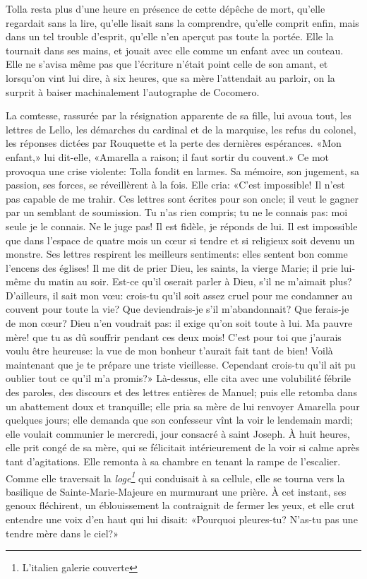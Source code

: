 Tolla resta plus d'une heure en présence de cette dépêche de mort, qu'elle regardait sans la lire, qu'elle lisait sans la comprendre, qu'elle comprit enfin, mais dans un tel trouble d'esprit, qu'elle n'en aperçut pas toute la portée. Elle la tournait dans ses mains, et jouait avec elle comme un enfant avec un couteau. Elle ne s'avisa même pas que l'écriture n'était point celle de son amant, et lorsqu'on vint lui dire, à six heures, que sa mère l'attendait au parloir, on la surprit à baiser machinalement l'autographe de Cocomero.

La comtesse, rassurée par la résignation apparente de sa fille, lui avoua tout, les lettres de Lello, les démarches du cardinal et de la marquise, les refus du colonel, les réponses dictées par Rouquette et la perte des dernières espérances. «Mon enfant,» lui dit-elle, «Amarella a raison; il faut sortir du couvent.» Ce mot provoqua une crise violente: Tolla fondit en larmes. Sa mémoire, son jugement, sa passion, ses forces, se réveillèrent à la fois. Elle cria: «C'est impossible! Il n'est pas capable de me trahir. Ces lettres sont écrites pour son oncle; il veut le gagner par un semblant de soumission. Tu n'as rien compris; tu ne le connais pas: moi seule je le connais. Ne le juge pas! Il est fidèle, je réponds de lui. Il est impossible que dans l'espace de quatre mois un c\oe{}ur si tendre et si religieux soit devenu un monstre. Ses lettres respirent les meilleurs sentiments: elles sentent bon comme l'encens des églises! Il me dit de prier Dieu, les saints, la vierge Marie; il prie lui-même du matin au soir. Est-ce qu'il oserait parler à Dieu, s'il ne m'aimait plus? D'ailleurs, il sait mon v\oe{}u: crois-tu qu'il soit assez cruel pour me condamner au couvent pour toute la vie? Que deviendrais-je s'il m'abandonnait? Que ferais-je de mon c\oe{}ur? Dieu n'en voudrait pas: il exige qu'on soit toute à lui. Ma pauvre mère! que tu as dû souffrir pendant ces deux mois! C'est pour toi que j'aurais voulu être heureuse: la vue de mon bonheur t'aurait fait tant de bien! Voilà maintenant que je te prépare une triste vieillesse. Cependant crois-tu qu'il ait pu oublier tout ce qu'il m'a promis?» Là-dessus, elle cita avec une volubilité fébrile des paroles, des discours et des lettres entières de Manuel; puis elle retomba dans un abattement doux et tranquille; elle pria sa mère de lui renvoyer Amarella pour quelques jours; elle demanda que son confesseur vînt la voir le lendemain mardi; elle voulait communier le mercredi, jour consacré à saint Joseph. À huit heures, elle prit congé de sa mère, qui se félicitait intérieurement de la voir si calme après tant d'agitations. Elle remonta à sa chambre en tenant la rampe de l'escalier. Comme elle traversait la \emph{loge\footnote{
L'italien galerie couverte
}} qui conduisait à sa cellule, elle se tourna vers la basilique de Sainte-Marie-Majeure en murmurant une prière. À cet instant, ses genoux fléchirent, un éblouissement la contraignit de fermer les yeux, et elle crut entendre une voix d'en haut qui lui disait: «Pourquoi pleures-tu? N'as-tu pas une tendre mère dans le ciel?»

